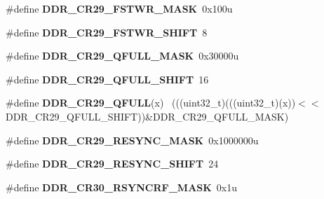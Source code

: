 \begin{DoxyCompactItemize}
\item 
\hypertarget{group___d_d_r___register___masks_ga2be18cfa75555a0e6c2f702a8cb1b33a}{}\#define {\bfseries D\+D\+R\+\_\+\+C\+R29\+\_\+\+F\+S\+T\+W\+R\+\_\+\+M\+A\+S\+K}~0x100u\label{group___d_d_r___register___masks_ga2be18cfa75555a0e6c2f702a8cb1b33a}

\item 
\hypertarget{group___d_d_r___register___masks_ga2c9737b7fc93a5f3551248158b8d4308}{}\#define {\bfseries D\+D\+R\+\_\+\+C\+R29\+\_\+\+F\+S\+T\+W\+R\+\_\+\+S\+H\+I\+F\+T}~8\label{group___d_d_r___register___masks_ga2c9737b7fc93a5f3551248158b8d4308}

\item 
\hypertarget{group___d_d_r___register___masks_ga511b12f6d0fcdc662f65956c01e7529b}{}\#define {\bfseries D\+D\+R\+\_\+\+C\+R29\+\_\+\+Q\+F\+U\+L\+L\+\_\+\+M\+A\+S\+K}~0x30000u\label{group___d_d_r___register___masks_ga511b12f6d0fcdc662f65956c01e7529b}

\item 
\hypertarget{group___d_d_r___register___masks_ga550daae5121363f0c15e27911da0eb96}{}\#define {\bfseries D\+D\+R\+\_\+\+C\+R29\+\_\+\+Q\+F\+U\+L\+L\+\_\+\+S\+H\+I\+F\+T}~16\label{group___d_d_r___register___masks_ga550daae5121363f0c15e27911da0eb96}

\item 
\hypertarget{group___d_d_r___register___masks_gae197d10af0ff281442bf23698471f16f}{}\#define {\bfseries D\+D\+R\+\_\+\+C\+R29\+\_\+\+Q\+F\+U\+L\+L}(x)                                            ~(((uint32\+\_\+t)(((uint32\+\_\+t)(x))$<$$<$D\+D\+R\+\_\+\+C\+R29\+\_\+\+Q\+F\+U\+L\+L\+\_\+\+S\+H\+I\+F\+T))\&D\+D\+R\+\_\+\+C\+R29\+\_\+\+Q\+F\+U\+L\+L\+\_\+\+M\+A\+S\+K)\label{group___d_d_r___register___masks_gae197d10af0ff281442bf23698471f16f}

\item 
\hypertarget{group___d_d_r___register___masks_ga6b3739148a2fe4cc0eed49e192e5bcc2}{}\#define {\bfseries D\+D\+R\+\_\+\+C\+R29\+\_\+\+R\+E\+S\+Y\+N\+C\+\_\+\+M\+A\+S\+K}~0x1000000u\label{group___d_d_r___register___masks_ga6b3739148a2fe4cc0eed49e192e5bcc2}

\item 
\hypertarget{group___d_d_r___register___masks_gad1a1f2bd3fecf705ed56180f96c9eaad}{}\#define {\bfseries D\+D\+R\+\_\+\+C\+R29\+\_\+\+R\+E\+S\+Y\+N\+C\+\_\+\+S\+H\+I\+F\+T}~24\label{group___d_d_r___register___masks_gad1a1f2bd3fecf705ed56180f96c9eaad}

\item 
\hypertarget{group___d_d_r___register___masks_ga7e1d0ffa57c02ac98627246d447fc16b}{}\#define {\bfseries D\+D\+R\+\_\+\+C\+R30\+\_\+\+R\+S\+Y\+N\+C\+R\+F\+\_\+\+M\+A\+S\+K}~0x1u\label{group___d_d_r___register___masks_ga7e1d0ffa57c02ac98627246d447fc16b}


\end{DoxyCompactItemize}
